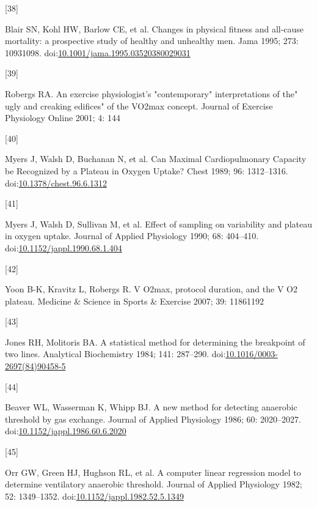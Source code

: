 \documentclass[
  letterpaper,
  DIV=11,
  numbers=noendperiod]{scrartcl}
\newlength{\cslhangindent}
\newlength{\csllabelwidth}
\newenvironment{CSLReferences}[2] %
 {\begin{list}{}{%
  \setlength{\itemindent}{0pt}
  \setlength{\leftmargin}{0pt}
  \setlength{\parsep}{0pt}
  \ifodd #1
   \setlength{\leftmargin}{\cslhangindent}
   \setlength{\itemindent}{-1\cslhangindent}
  \fi
  \setlength{\itemsep}{#2\baselineskip}}}
 {\end{list}}
\newcommand{\CSLLeftMargin}[1]{\parbox[t]{\csllabelwidth}{\strut#1\strut}}
\newcommand{\CSLRightInline}[1]{\parbox[t]{\linewidth - \csllabelwidth}{\strut#1\strut}}
\begin{document}
\begin{CSLReferences}{0}{1}
\CSLLeftMargin{{[}38{]} }%
\CSLRightInline{Blair SN, Kohl HW, Barlow CE, et al. Changes in physical
fitness and all-cause mortality: a prospective study of healthy and
unhealthy men. Jama 1995; 273: 10931098.
doi:\href{https://doi.org/10.1001/jama.1995.03520380029031}{10.1001/jama.1995.03520380029031}}

\CSLLeftMargin{{[}39{]} }%
\CSLRightInline{Robergs RA. An exercise physiologist's
{"}contemporary{"} interpretations of the{"} ugly and creaking
edifices{"} of the VO2max concept. Journal of Exercise Physiology Online
2001; 4: 144}

\CSLLeftMargin{{[}40{]} }%
\CSLRightInline{Myers J, Walsh D, Buchanan N, et al. Can Maximal
Cardiopulmonary Capacity be Recognized by a Plateau in Oxygen Uptake?
Chest 1989; 96: 1312--1316.
doi:\href{https://doi.org/10.1378/chest.96.6.1312}{10.1378/chest.96.6.1312}}

\CSLLeftMargin{{[}41{]} }%
\CSLRightInline{Myers J, Walsh D, Sullivan M, et al. Effect of sampling
on variability and plateau in oxygen uptake. Journal of Applied
Physiology 1990; 68: 404--410.
doi:\href{https://doi.org/10.1152/jappl.1990.68.1.404}{10.1152/jappl.1990.68.1.404}}

\CSLLeftMargin{{[}42{]} }%
\CSLRightInline{Yoon B-K, Kravitz L, Robergs R. V O2max, protocol
duration, and the V O2 plateau. Medicine \& Science in Sports \&
Exercise 2007; 39: 11861192}

\CSLLeftMargin{{[}43{]} }%
\CSLRightInline{Jones RH, Molitoris BA. A statistical method for
determining the breakpoint of two lines. Analytical Biochemistry 1984;
141: 287--290.
doi:\href{https://doi.org/10.1016/0003-2697(84)90458-5}{10.1016/0003-2697(84)90458-5}}

\CSLLeftMargin{{[}44{]} }%
\CSLRightInline{Beaver WL, Wasserman K, Whipp BJ. A new method for
detecting anaerobic threshold by gas exchange. Journal of Applied
Physiology 1986; 60: 2020--2027.
doi:\href{https://doi.org/10.1152/jappl.1986.60.6.2020}{10.1152/jappl.1986.60.6.2020}}

\CSLLeftMargin{{[}45{]} }%
\CSLRightInline{Orr GW, Green HJ, Hughson RL, et al. A computer linear
regression model to determine ventilatory anaerobic threshold. Journal
of Applied Physiology 1982; 52: 1349--1352.
doi:\href{https://doi.org/10.1152/jappl.1982.52.5.1349}{10.1152/jappl.1982.52.5.1349}}


\end{CSLReferences}
\end{document}
